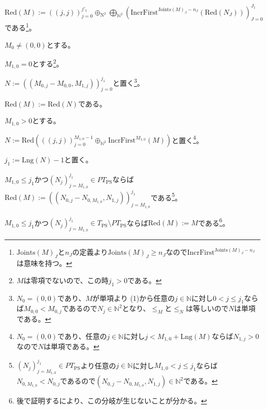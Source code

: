 \documentclass[dvipdfmx,uplatex]{jsarticle}
\theoremstyle{customnonumberbreakfortheorem}
\theoremstyle{customnonumberbreakforproof}
\begin{document}
\begin{nenumerate}
\begin{nenumerate}
\begin{nenumerate}
\begin{nenumerate}
			\end{nenumerate}
			\item \(\textrm{Red}(M) := ((j,j))_{j=0}^{j'_1} \oplus_{\textrm{N}^2} \bigoplus_{\mathbb{N}^2} (\textrm{IncrFirst}^{\textrm{Joints}(M)_J-n_J}(\textrm{Red}(N_J)))_{J=0}^{J_1}\)である\footnote{\(\textrm{Joints}(M)_J\)と\(n_J\)の定義より\(\textrm{Joints}(M)_J \geq n_J\)なので\(\textrm{IncrFirst}^{\textrm{Joints}(M)_J-n_J}\)は意味を持つ。}。
		\end{nenumerate}
		\item \(M_0 \neq (0,0)\)とする。
		\begin{nenumerate}
			\item \(M_{1,0} = 0\)とする\footnote{\(M\)は零項でないので、この時\(j_1 > 0\)である。}。
			\begin{nenumerate}
				\item \(N := ((M_{0,j} - M_{0,0},M_{1,j}))_{j=0}^{j_1}\)と置く\footnote{\(N_0 = (0,0)\)であり、\(M\)が単項より (1)から任意の\(j \in \mathbb{N}\)に対し\(0 < j \leq j_1\)ならば\(M_{0,0} < M_{0,j}\)であるので\(N_j \in \mathbb{N}^2\)となり、\(\leq_M\)と\(\leq_N\)は等しいので\(N\)は単項である。}。
				\item \(\textrm{Red}(M) := \textrm{Red}(N)\)である。
			\end{nenumerate}
			\item \(M_{1,0} > 0\)とする。
			\begin{nenumerate}
				\item \(N := \textrm{Red}(((j,j))_{j=0}^{M_{1,0}-1} \oplus_{\mathbb{N}^2} \textrm{IncrFirst}^{M_{1,0}}(M))\)と置く\footnote{\(N_0 = (0,0)\)であり、任意の\(j \in \mathbb{N}\)に対し\(j < M_{1,0} + \textrm{Lng}(M)\)ならば\(N_{1,j} > 0\)なので\(N\)は単項である。}。
				\item \(j_1 := \textrm{Lng}(N) - 1\)と置く。
				\begin{nenumerate}
					\item \(M_{1,0} \leq j_1\)かつ\((N_j)_{j=M_{1,0}}^{j_1} \in PT_{\textrm{PS}}\)ならば\(\textrm{Red}(M) := ((N_{0,j}-N_{0,M_{1,0}},N_{1,j}))_{j=M_{1,0}}^{j_1}\)である\footnote{\((N_j)_{j=M_{1,0}}^{j_1} \in PT_{\textrm{PS}}\)より任意の\(j \in \mathbb{N}\)に対し\(M_{1,0} < j \leq j_1\)ならば\(N_{0,M_{1,0}} < N_{0,j}\)であるので\((N_{0,j}-N_{0,M_{1,0}},N_{1,j}) \in \mathbb{N}^2\)である。}。
					\item \(M_{1,0} \leq j_1\)かつ\((N_j)_{j=M_{1,0}}^{j_1} \in T_{\textrm{PS}} \setminus PT_{\textrm{PS}}\)ならば\(\textrm{Red}(M) := M\)である\footnote{後で証明するにより、この分岐が生じないことが分かる。}。

\end{nenumerate}
\end{nenumerate}
\end{nenumerate}
\end{nenumerate}
\end{nenumerate}
\end{document}
